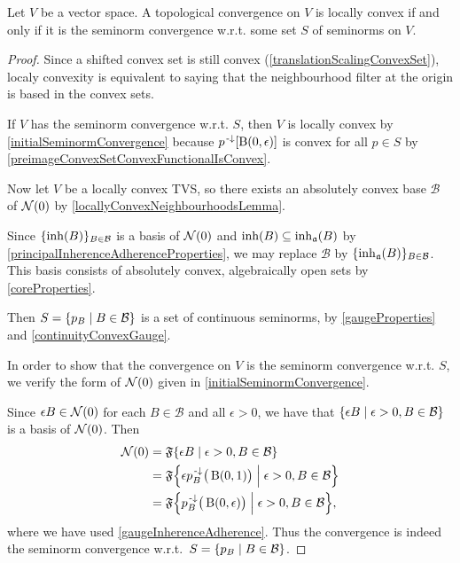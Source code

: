 \begin{proposition} \label{locallyConvexSeminormTopology}
Let $V$ be a vector space. A topological convergence on $V$ is locally convex \textup{if and only if} it is the seminorm convergence w.r.t. some set $S$ of seminorms on $V$.
\end{proposition}
\begin{proof}
Since a shifted convex set is still convex (\ref{translationScalingConvexSet}), localy convexity is equivalent to saying that the neighbourhood filter at the origin is based in the convex sets.

If $V$ has the seminorm convergence w.r.t. $S$, then $V$ is locally convex by \ref{initialSeminormConvergence} because $p^{\text{\hspace{0.15em}-}\downarrow}[\operatorname{B}(0,\epsilon)]$ is convex for all $p\in S$ by \ref{preimageConvexSetConvexFunctionalIsConvex}.

Now let $V$ be a locally convex TVS, so there exists an absolutely convex base $\mathcal{B}$ of $\operatorname{\mathcal{N}}(0)$ by \ref{locallyConvexNeighbourhoodsLemma}.

Since $\{\operatorname{inh}(B)\}_{B\in\mathcal{B}}$ is a basis of $\operatorname{\mathcal{N}}(0)$ and $\operatorname{inh}(B) \subseteq \operatorname{inh}_\mathfrak{a}(B)$ by \ref{principalInherenceAdherenceProperties}, we may replace $\mathcal{B}$ by $\{\operatorname{inh}_\mathfrak{a}(B)\}_{B\in\mathcal{B}}$.
This basis consists of absolutely convex, algebraically open sets by \ref{coreProperties}.

Then $S = \setbuilder{p_B}{B\in \mathcal{B}}$ is a set of continuous seminorms, by \ref{gaugeProperties} and \ref{continuityConvexGauge}.

In order to show that the convergence on $V$ is the seminorm convergence w.r.t. $S$, we verify the form of $\operatorname{\mathcal{N}}(0)$ given in \ref{initialSeminormConvergence}.

Since $\epsilon B\in \operatorname{\mathcal{N}}(0)$ for each $B\in\mathcal{B}$ and all $\epsilon > 0$, we have that $\setbuilder{\epsilon B}{\epsilon > 0, B\in \mathcal{B}}$ is a basis of $\operatorname{\mathcal{N}}(0)$.
Then
\begin{align*}
\neighbourhood(0) &= \mathfrak{F}\setbuilder{\epsilon B}{\epsilon > 0, B\in \mathcal{B}} \\
&= \mathfrak{F}\setbuilder{\epsilon p_B^\preimf\big(\ball(0,1)\big)}{\epsilon > 0, B\in \mathcal{B}} \\
&= \mathfrak{F}\setbuilder{p_B^\preimf\big(\ball(0,\epsilon)\big)}{\epsilon > 0, B\in \mathcal{B}},
\end{align*}
where we have used \ref{gaugeInherenceAdherence}. Thus the convergence is indeed the seminorm convergence w.r.t.\ $S = \setbuilder{p_B}{B\in \mathcal{B}}$.
\end{proof}

